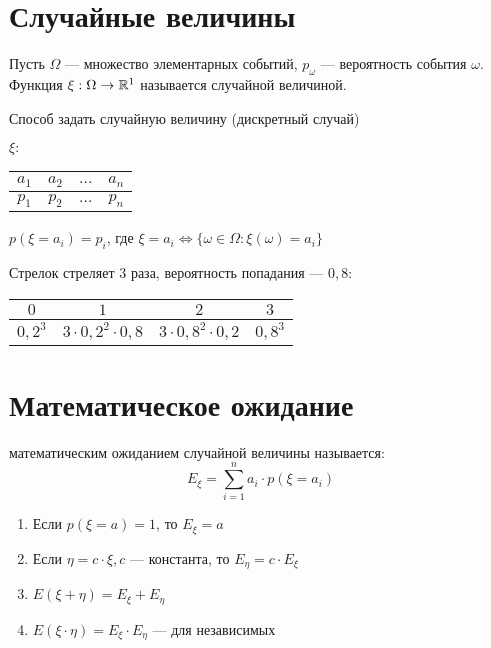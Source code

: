 




\section{Случайные величины}

\begin{definition}
    Пусть $\Omega$ --- множество элементарных событий, $p_\omega$ --- вероятность события $\omega$. Функция $\xi: \Omega \to \mathbb{R}^1$ называется случайной величиной.
\end{definition}


\begin{remark} Способ задать случайную величину (дискретный случай)
    
    $\xi:$ \begin{tabular}{c|c|c|c}
        $a_1$ & $a_2$ & $\ldots$ & $a_n$ \\
        \hline
        $p_1$ & $p_2$ & $\ldots$ & $p_n$ \\
    \end{tabular}

    $p(\xi = a_i) = p_i$, где $\xi = a_i \Leftrightarrow \{\omega \in \Omega: \xi(\omega) = a_i\}$
\end{remark}

\begin{eg} Стрелок стреляет 3 раза, вероятность попадания --- $0,8$:
    
    \begin{tabular}{c|c|c|c}
        $0$ & $1$ & $2$ & $3$ \\
        \hline
        $0,2^3$ & $3 \cdot 0,2^2 \cdot 0,8$ & $3 \cdot 0,8^2 \cdot 0,2$ & $0,8^3$ \\
    \end{tabular}
\end{eg}

\section{Математическое ожидание}

\begin{definition} математическим ожиданием случайной величины называется:
    $$E_\xi = \sum_{i=1}^{n} a_i \cdot p(\xi = a_i)$$
\end{definition}

\begin{properties}
    \begin{enumerate}
        \item Если $p(\xi = a) = 1$, то $E_\xi = a$
        \item Если $\eta = c \cdot \xi, c$ --- константа, то $E_\eta = c \cdot E_\xi$
        \item $E(\xi + \eta) = E_\xi + E_\eta$
        \item $E(\xi \cdot \eta) = E_\xi \cdot E_\eta$ --- для независимых
    \end{enumerate}
\end{properties}

